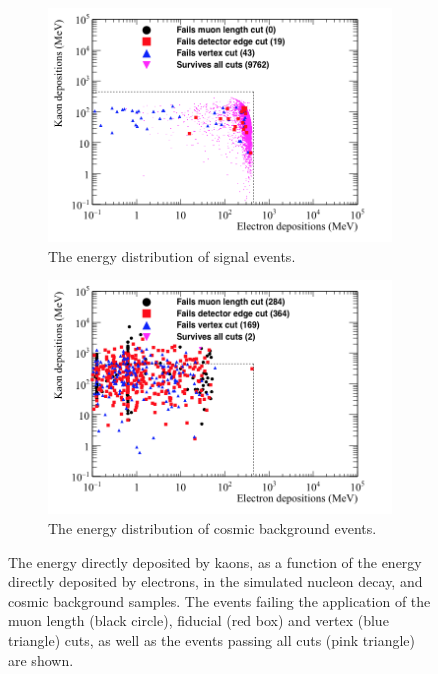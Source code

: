 \begin{figure}[h!]
  \centering
  \begin{subfigure}{0.8\textwidth}
    \includegraphics[width=\textwidth]{NucleonDecay_Kaon_vs_Elec_Can}
    \caption{The energy distribution of signal events.}
    \label{fig:NDK_Kaon_Elec_EDist_Sig}
  \end{subfigure}
  \begin{subfigure}{0.8\textwidth}
    \includegraphics[width=\textwidth]{CosmicBackground_Kaon_vs_Elec_Can}
    \caption{The energy distribution of cosmic background events.}
    \label{fig:NDK_Kaon_Elec_EDist_Cosmo}
  \end{subfigure}
  \caption[The energy directly deposited by kaons, as a function of the energy directly deposited by electrons, in the simulated nucleon decay, and cosmic background samples]
          {The energy directly deposited by kaons, as a function of the energy directly deposited by electrons, in the simulated nucleon decay, and cosmic background samples. The events failing the application of the muon length (black circle), fiducial (red box) and vertex (blue triangle) cuts, as well as the events passing all cuts (pink triangle) are shown.}
  \label{fig:NDK_Kaon_Elec_EDist}
\end{figure}

